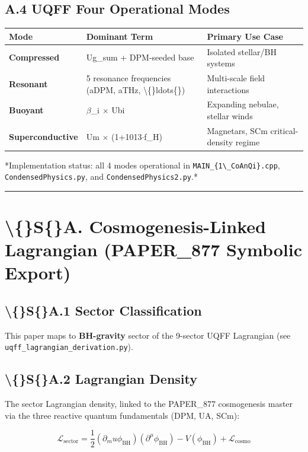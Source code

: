 \documentclass[11pt]{article}
\begin{document}
\subsection*{A.4 UQFF Four Operational Modes}

\begin{center}
\begin{longtable}{lll}
\toprule
Mode & Dominant Term & Primary Use Case \tabularnewline
\midrule
\endhead
\textbf{Compressed} & Ug\_sum + DPM-seeded base & Isolated stellar/BH systems \tabularnewline
\textbf{Resonant} & 5 resonance frequencies (aDPM, aTHz, \textbackslash\{\}ldots\{\}) & Multi-scale field interactions \tabularnewline
\textbf{Buoyant} & $\beta$\_i $\times$ Ubi & Expanding nebulae, stellar winds \tabularnewline
\textbf{Superconductive} & Um $\times$ (1+1013$\cdot$f\_H) & Magnetars, SCm critical-density regime \tabularnewline
\bottomrule
\end{longtable}
\end{center}

*Implementation status: all 4 modes operational in \verb|MAIN_{1\_CoAnQi}.cpp|, \verb|CondensedPhysics.py|, and \verb|CondensedPhysics2.py|.*

\noindent\rule{\textwidth}{0.4pt}

\section*{\textbackslash\{\}S\{\}A. Cosmogenesis-Linked Lagrangian (PAPER\_877 Symbolic Export)}

\subsection*{\textbackslash\{\}S\{\}A.1 Sector Classification}

This paper maps to \textbf{BH-gravity} sector of the 9-sector UQFF Lagrangian (see \verb|uqff_lagrangian_derivation.py|).

\subsection*{\textbackslash\{\}S\{\}A.2 Lagrangian Density}

The sector Lagrangian density, linked to the PAPER\_877 cosmogenesis master via the three reactive quantum fundamentals (DPM, UA, SCm):

$$\mathcal{L}_{\mathrm{sector}} = \frac{1}{2}(\partial_mu \phi_{\mathrm{BH}})(\partial^\mu \phi_{\mathrm{BH}}) - V(\phi_{\mathrm{BH}}) + \mathcal{L}_{\mathrm{cosmo}}$$
\end{document}
